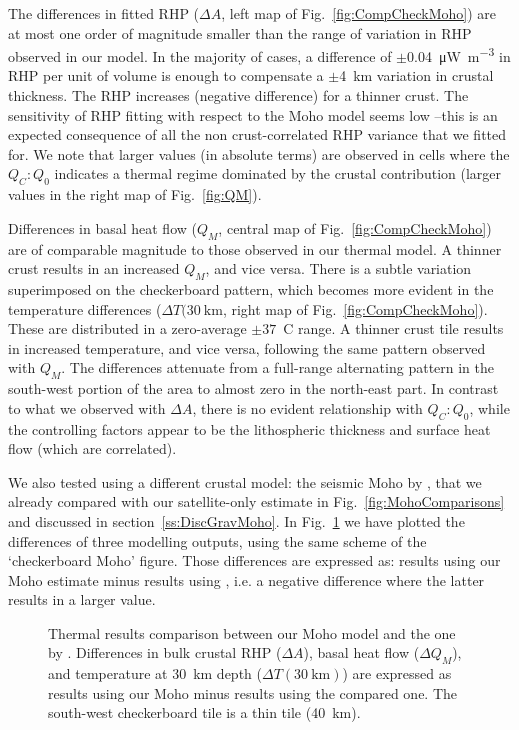 {The differences in fitted RHP ($\Delta A$, left map of Fig.~\ref{fig:CompCheckMoho}) are at most one order of magnitude smaller than the range of variation in RHP observed in our model.
In the majority of cases, a difference of $\pm$\SI{0.04}{\micro \watt \per \cubic \metre} in RHP per unit of volume is enough to compensate a $\pm$\SI{4}{\kilo \metre} variation in crustal thickness.
The RHP increases (negative difference) for a thinner crust.
The sensitivity of RHP fitting with respect to the Moho model seems low --this is an expected consequence of all the non crust-correlated RHP variance that we fitted for.
We note that larger values (in absolute terms) are observed in cells where the $Q_C:Q_0$ indicates a thermal regime dominated by the crustal contribution (larger values in the right map of Fig.~\ref{fig:QM}).

Differences in basal heat flow ($Q_M$, central map of Fig.~\ref{fig:CompCheckMoho}) are of comparable magnitude to those observed in our thermal model.
A thinner crust results in an increased $Q_M$, and vice versa.
There is a subtle variation superimposed on the checkerboard pattern, which becomes more evident in the temperature differences ($\Delta T(30~\mathrm{km}$, right map of Fig.~\ref{fig:CompCheckMoho}).
These are distributed in a zero-average $\pm 37$~\textdegree C range.
A thinner crust tile results in increased temperature, and vice versa, following the same pattern observed with $Q_M$.
The differences attenuate from a full-range alternating pattern in the south-west portion of the area to almost zero in the north-east part.
In contrast to what we observed with $\Delta A$, there is no evident relationship with $Q_C:Q_0$, while the controlling factors appear to be the lithospheric thickness and surface heat flow (which are correlated).

We also tested using a different crustal model: the seismic Moho by \textcite{Grad2009}, that we already compared with our satellite-only estimate in Fig.~\ref{fig:MohoComparisons} and discussed in section~\ref{ss:DiscGravMoho}.
In Fig.~\ref{fig:CompGradMoho} we have plotted the differences of three modelling outputs, using the same scheme of the `checkerboard Moho' figure.
Those differences are expressed as: results using our Moho estimate minus results using \textcite{Grad2009}, i.e. a negative difference where the latter results in a larger value.

\begin{figure}
	\begin{adjustbox}{center}
	\end{adjustbox}
	\caption{Thermal results comparison between our Moho model and the one by \textcite{Grad2009}. Differences in bulk crustal RHP ($\Delta A$), basal heat flow ($\Delta Q_M$), and temperature at 30~km depth ($\Delta T(30~\mathrm{km})$) are expressed as results using our Moho minus results using the compared one. The south-west checkerboard tile is a thin tile (40~km).}
	\label{fig:CompGradMoho}
\end{figure}

}
